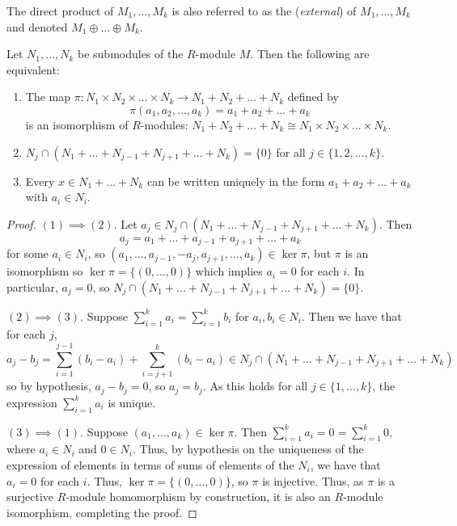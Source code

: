 The direct product of $M_1,...,M_k$ is also referred to as the (\emph{external})  of $M_1,...,M_k$ and denoted $M_1\oplus ... \oplus M_k$. 

\begin{prop}
    Let $N_1,...,N_k$ be submodules of the $R$-module $M$. Then the following are equivalent: \begin{enumerate}
        \item The map $\pi:N_1\times N_2\times ... \times N_k\rightarrow N_1+N_2+...+N_k$ defined by \begin{equation*}
                \pi(a_1,a_2,...,a_k) = a_1+a_2+...+a_k
        \end{equation*}
            is an isomorphism of $R$-modules: $N_1+N_2+...+N_k\cong N_1\times N_2\times ...\times N_k$.
        \item $N_j\cap(N_1+...+N_{j-1}+N_{j+1}+...+N_k) = \{0\}$ for all $j \in \{1,2,...,k\}$.
        \item Every $x \in N_1+...+N_k$ can be written uniquely in the form $a_1+a_2+...+a_k$ with $a_i \in N_i$.
    \end{enumerate}
\end{prop}
\begin{proof}
    $(1)\implies (2)$. Let $a_j \in N_j\cap(N_1+...+N_{j-1}+N_{j+1}+...+N_k)$. Then \begin{equation*}
        a_j = a_1+...+a_{j-1}+a_{j+1}+...+a_k
    \end{equation*}
    for some $a_i \in N_i$, so $(a_1,...,a_{j-1},-a_j,a_{j+1},...,a_k) \in \ker \pi$, but $\pi$ is an isomorphism so $\ker\pi = \{(0,...,0)\}$ which implies $a_i = 0$ for each $i$. In particular, $a_j = 0$, so $N_j\cap(N_1+...+N_{j-1}+N_{j+1}+...+N_k) = \{0\}$.

    $(2)\implies (3)$. Suppose $\sum_{i=1}^ka_i = \sum_{i=1}^kb_i$ for $a_i,b_i \in N_i$. Then we have that for each $j$, $$a_j-b_j = \sum_{i=1}^{j-1}(b_i-a_i)+\sum_{i=j+1}^k(b_i-a_i) \in N_j\cap(N_1+...+N_{j-1}+N_{j+1}+...+N_k)$$ so by hypothesis, $a_j -b_j = 0$, so $a_j = b_j$. As this holds for all $j \in \{1,...,k\}$, the expression $\sum_{i=1}^ka_i$ is unique.

    $(3)\implies (1)$. Suppose $(a_1,...,a_k) \in \ker\pi$. Then $\sum_{i=1}^ka_i = 0 = \sum_{i=1}^k0$, where $a_i \in N_i$ and $0 \in N_i$. Thus, by hypothesis on the uniqueness of the expression of elements in terms of sums of elements of the $N_i$, we have that $a_i = 0$ for each $i$. Thus, $\ker\pi = \{(0,...,0)\}$, so $\pi$ is injective. Thus, as $\pi$ is a surjective $R$-module homomorphism by construction, it is also an $R$-module isomorphism, completing the proof.
\end{proof}


